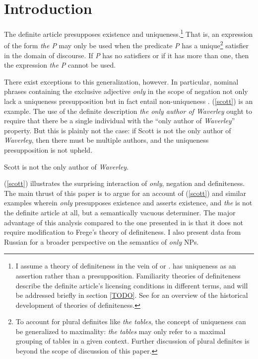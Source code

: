 \section{Introduction \label{sec:intro}}
The definite article presupposes existence and uniqueness.\footnote{I assume a theory of definiteness in the vein of \citet{frege} or \citet{strawson50}. \citet{russell} has uniqueness as an assertion rather than a presupposition. Familiarity theories of definiteness describe the definite article's licensing conditions in different terms, and will be addressed briefly in section \ref{TODO}. See \citet{horn-abbott-2012} for an overview of the historical development of theories of definiteness.} That is, an expression of the form \textit{the P} may only be used when the predicate \textit{P} has a unique\footnote{To account for plural definites like \textit{the tables}, the concept of uniqueness can be generalized to maximality: \textit{the tables} may only refer to a maximal grouping of tables in a given context. Further discussion of plural definites is beyond the scope of discussion of this paper.} satisfier in the domain of discourse. If \textit{P} has no satisfiers or if it has more than one, then the expression \textit{the P} cannot be used.

There exist exceptions to this generalization, however. In particular, nominal phrases containing the exclusive adjective \textit{only} in the scope of negation not only lack a uniqueness presupposition but in fact entail non-uniqueness \citep{cb2015}. (\ref{scott}) is an example. The use of the definite description \textit{the only author of Waverley} ought to require that there be a single individual with the ``only author of \textit{Waverley}'' property. But this is plainly not the case: if Scott is not the only author of \textit{Waverley}, then there must be multiple authors, and the uniqueness presupposition is not upheld.

\begin{exe}
	\ex \label{scott} Scott is not the only author of \textit{Waverley}.
\end{exe}

(\ref{scott}) illustrates the surprising interaction of \textit{only}, negation and definiteness. The main thrust of this paper is to argue for an account of (\ref{scott}) and similar examples wherein \textit{only} presupposes existence and asserts existence, and \textit{the} is not the definite article at all, but a semantically vacuous determiner. The major advantage of this analysis compared to the one presented in \citet{cb2015} is that it does not require modification to Frege's theory of definiteness. I also present data from Russian for a broader perspective on the semantics of \textit{only} NPs.

